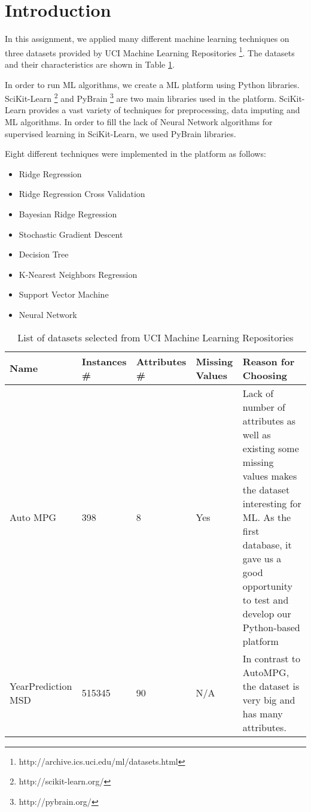 \section{Introduction}
In this assignment, we applied many different machine learning techniques on three datasets provided by UCI Machine Learning Repositories \footnote{http://archive.ics.uci.edu/ml/datasets.html}. The datasets and their characteristics are shown in Table \ref{table:datasets}.

In order to run ML algorithms, we create a ML platform using Python libraries. SciKit-Learn \footnote{http://scikit-learn.org/} and PyBrain  \footnote{http://pybrain.org/} are two main libraries used in the platform. SciKit-Learn provides a vast variety of techniques for preprocessing, data imputing and ML algorithms. In order to fill the lack of Neural Network algorithms for supervised learning in SciKit-Learn, we used PyBrain libraries.

Eight different techniques were implemented in the platform as follows:
\begin{itemize}
  \item Ridge Regression
  \item Ridge Regression Cross Validation
  \item Bayesian Ridge Regression
  \item Stochastic Gradient Descent
  \item Decision Tree
  \item K-Nearest Neighbors Regression
  \item Support Vector Machine
  \item Neural Network  
\end{itemize}

\begin{center}
\begin{table}
    \begin{tabular}{ | p{2.5cm} | p{1cm} | p{1cm} | p{1cm} | p{7cm} |}
    \hline
    Name & Instances \# & Attributes \# & Missing Values & Reason for Choosing \\ \hline
    Auto MPG & 398 & 8 & Yes & Lack of number of attributes as well as existing some missing values makes the dataset interesting for ML. As the first database, it gave us a good opportunity to test and develop our Python-based platform\\ \hline
    YearPrediction MSD & 515345 & 90 & N/A & In contrast to AutoMPG, the dataset is very big and has many attributes.\\ \hline
    \end{tabular}
    \caption{List of datasets selected from UCI Machine Learning Repositories}
    \label{table:datasets}
    \end{table}
\end{center}
